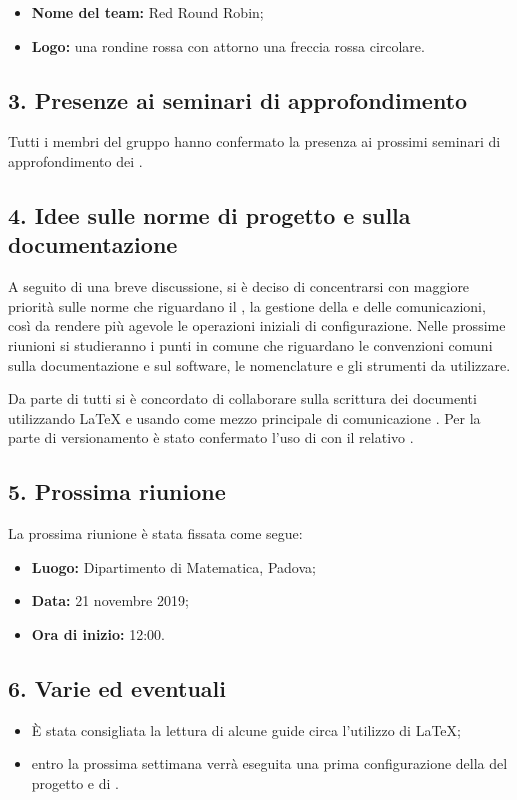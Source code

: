 \begin{itemize}
	\item \textbf{Nome del team:} Red Round Robin;
	\item \textbf{Logo:} una rondine rossa con attorno una freccia rossa circolare.
\end{itemize}

\subsection*{3. Presenze ai seminari di approfondimento}

Tutti i membri del gruppo hanno confermato la presenza ai prossimi seminari di approfondimento dei .

\subsection*{4. Idee sulle norme di progetto e sulla documentazione}


A seguito di una breve discussione, si è deciso di concentrarsi con maggiore priorità sulle norme che riguardano il , la gestione della  e delle comunicazioni, così da rendere più agevole le operazioni iniziali di configurazione.
Nelle prossime riunioni si studieranno i punti in comune che riguardano le convenzioni comuni sulla documentazione e sul software, le nomenclature e gli strumenti da utilizzare.


Da parte di tutti si è concordato di collaborare sulla scrittura dei documenti utilizzando \LaTeX{} e usando come mezzo principale di comunicazione . Per la parte di versionamento è stato confermato l'uso di  con il relativo .

\subsection*{5. Prossima riunione}

La prossima riunione è stata fissata come segue:
\begin{itemize}
	\item \textbf{Luogo:} Dipartimento di Matematica, Padova;

	\item \textbf{Data:} 21 novembre 2019;

	\item \textbf{Ora di inizio:} 12:00.
\end{itemize}


\subsection*{6. Varie ed eventuali}

\begin{itemize}

	\item È stata consigliata la lettura di alcune guide circa l'utilizzo di \LaTeX{};
	\item entro la prossima settimana verrà eseguita una prima configurazione della  del progetto e di .
\end{itemize}


